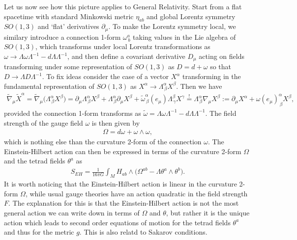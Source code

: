 \documentclass[../geometry_main.tex]{subfiles}
\begin{document}
Let us now see how this picture applies to General Relativity.
Start from a flat spacetime with standard Minkowski metric $\eta_{ab}$ and global Lorentz symmetry $SO(1,3)$ and `flat' derivatives $\partial_\mu$.
To make the Lorentz symmetry local, we similary introduce a connection 1-form $\omega^a_{\, b}$ taking values in the Lie algebra of $SO(1,3)$, which transforms under local Lorentz transformations as $\omega \to \Lambda \omega \Lambda^{-1} - d\Lambda \Lambda^{-1}$, and then define a covariant derivative $D_\mu$ acting on fields transforming under some representation of $SO(1,3)$ as $D = d +\omega $ so that $D \to \Lambda D \Lambda^{-1}$.
To fix ideas consider the case of a vector $X^\alpha$ transforming in the fundamental representation of $SO(1,3)$ as $X^\alpha \to \Lambda^\alpha_{\, \beta} X^\beta$.
Then we have
\begin{align}
    \tilde{\nabla}_\mu \tilde{X}^\alpha = \tilde{\nabla}_\mu \big(\Lambda^\alpha_{\, \beta} X^\beta\big) 
    = \partial_\mu \Lambda^\alpha_{\, \beta} X^\beta + \Lambda^\alpha_{\, \beta} \partial_\mu X^\beta + \tilde{\omega}^\alpha_{\,\beta}(e_\mu) \Lambda^\beta_{\, \gamma} X^\gamma
    \overset{!}{=}\Lambda^\alpha_{\, \beta} \nabla_\mu X^\beta := \partial_\mu X^\alpha + \omega(e_\mu)^\alpha_{\, \beta} X^\beta,
\end{align}
provided the connection 1-form transforms as $\tilde{\omega} = \Lambda \omega \Lambda^{-1} - d\Lambda \Lambda^{-1}$.
The field strength of the gauge field $\omega$ is then given by
\begin{align}
    \Omega = d\omega + \omega \wedge \omega,
\end{align}
which is nothing else than the curvature 2-form of the connection $\omega$.
The Einstein-Hilbert action can then be expressed in terms of the curvature 2-form $\Omega$ and the tetrad fields $\theta^a$ as
\begin{align}
    S_{EH} = \frac{1}{16\pi G}\int_M H_{ab}\wedge \Big( \Omega^{ab} - \Lambda \theta^a \wedge \theta^b\Big).
\end{align}
It is worth noticing that the Einstein-Hilbert action is linear in the curvature 2-form $\Omega$, while usual gauge theories have an action quadratic in the field strength $F$.
The explanation for this is that the Einstein-Hilbert action is not the most general action we can write down in terms of $\Omega$ and $\theta$, but rather it is the unique action which leads to second order equations of motion for the tetrad fields $\theta^a$ and thus for the metric $g$.
This is also relatd to Sakarov conditions.
\end{document}
